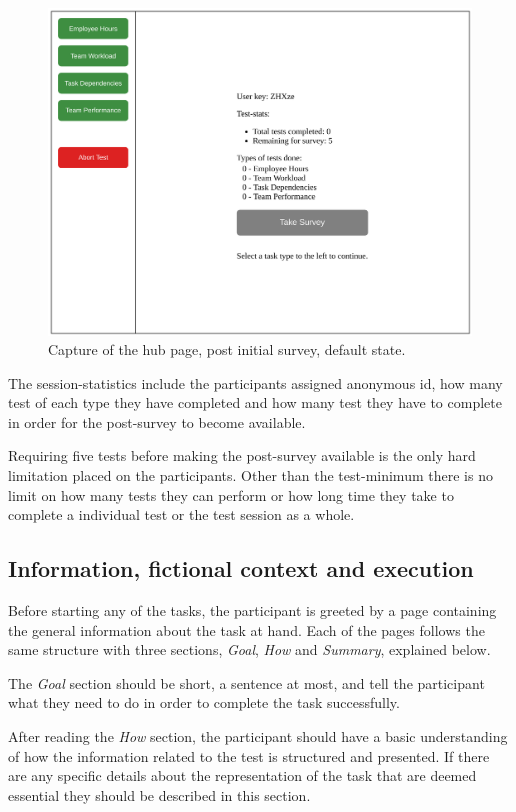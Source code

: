 \documentclass[nofilelist,dvipsnames]{cslthse-msc}
\begin{document}
{        \begin{figure}[h!]
          \centering
          \includegraphics[width=.7\textwidth]{figures/captures/webapp_main_statistics.pdf}
          \caption{Capture of the hub page, post initial survey, default state.}
          \label{label_mainStatistics}
        \end{figure}

        The session-statistics include the participants assigned anonymous id,
        how many test of each type they have completed and how many test they
        have to complete in order for the post-survey to become available.

        Requiring five tests before making the post-survey available is the only
        hard limitation placed on the participants. Other than the test-minimum
        there is no limit on how many tests they can perform or how long time
        they take to complete a individual test or the test session as a whole.

      \subsection{Information, fictional context and execution}

        Before starting any of the tasks, the participant is greeted by a page
        containing the general information about the task at hand. Each of the
        pages follows the same structure with three sections, \textit{Goal},
        \textit{How} and \textit{Summary}, explained below.

        The \textit{Goal} section should be short{\findref}, a sentence at
        most{\findref}, and tell the participant what they need to do in order
        to complete the task successfully.

        After reading the \textit{How} section, the participant should have a
        basic understanding of how the information related to the test is
        structured and presented. If there are any specific details about the
        representation of the task that are deemed essential they should be
        described in this section.

}
\end{document}
